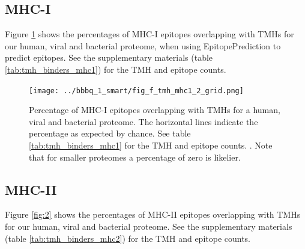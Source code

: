 \subsection{MHC-I}

Figure \ref{fig:1} shows the percentages of MHC-I epitopes overlapping 
with TMHs for our human, viral and bacterial proteome,
when using EpitopePrediction to predict epitopes.
See the supplementary materials (table \ref{tab:tmh_binders_mhc1}) 
for the TMH and epitope counts.



\begin{figure}[!htbp]
  \texttt{[image: ../bbbq\_1\_smart/fig\_f\_tmh\_mhc1\_2\_grid.png]}
  \caption{
    Percentage of MHC-I epitopes overlapping with TMHs
    for a human, viral and bacterial proteome.
    The horizontal lines indicate the percentage as expected by chance.
    See table \ref{tab:tmh_binders_mhc1} for the TMH and epitope counts.
    .
    Note that for smaller proteomes a percentage of zero is likelier.
  }
  \label{fig:1}
\end{figure}

\subsection{MHC-II}

Figure \ref{fig:2} shows the percentages of MHC-II epitopes overlapping 
with TMHs for our human, viral and bacterial proteome.
See the supplementary materials (table \ref{tab:tmh_binders_mhc2}) 
for the TMH and epitope counts.


